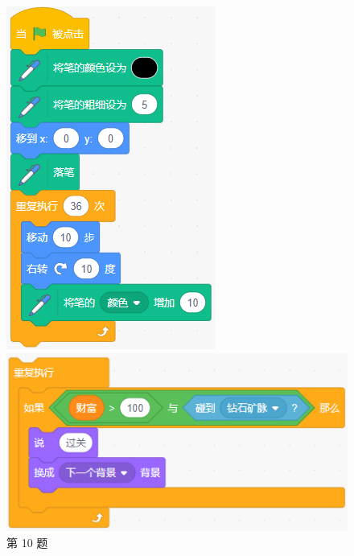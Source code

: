 \documentclass[10pt, a4paper]{article}
\begin{document}
\begin{enumerate}
\begin{figure}[htbp]
\begin{minipage}[t]{.13\textwidth}
                \includegraphics[width=\textwidth]{figure/10.png}
                \caption*{第 10 题}
            \end{minipage}
            \begin{minipage}[t]{.28\textwidth}
                \centering
                \includegraphics[width=\textwidth]{figure/13.png}

\end{minipage}
\end{figure}
\end{enumerate}
\end{document}
